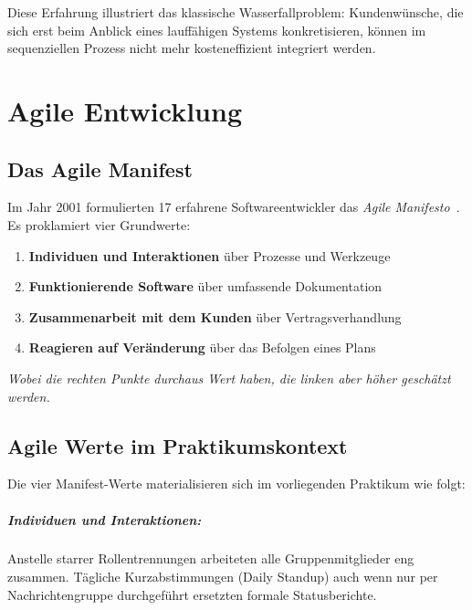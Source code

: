 \documentclass[12pt, a4paper, twoside]{report}
\begin{document}
Diese Erfahrung illustriert das klassische Wasserfallproblem: Kundenwünsche, die sich erst
beim Anblick eines lauffähigen Systems konkretisieren, können im sequenziellen Prozess nicht
mehr kosteneffizient integriert werden.

\chapter{Agile Entwicklung}
\label{chap:agil}

\section{Das Agile Manifest}

Im Jahr 2001 formulierten 17 erfahrene Softwareentwickler das \textit{Agile Manifesto}~\autocite{beck2001}.
Es proklamiert vier Grundwerte:

\begin{tcolorbox}[
  enhanced, breakable,
  colback=hsAccent!60, colframe=hsPrimary,
  title={\textbf{Die vier Werte des Agilen Manifests}},
  fonttitle=\bfseries, boxrule=1pt, arc=4pt
]
  \begin{enumerate}[label=\arabic*., leftmargin=1.5em]
    \item \textbf{Individuen und Interaktionen} über Prozesse und Werkzeuge
    \item \textbf{Funktionierende Software} über umfassende Dokumentation
    \item \textbf{Zusammenarbeit mit dem Kunden} über Vertragsverhandlung
    \item \textbf{Reagieren auf Veränderung} über das Befolgen eines Plans
  \end{enumerate}
  \vspace{6pt}
  \textit{Wobei die rechten Punkte durchaus Wert haben, die linken aber höher geschätzt werden.}
\end{tcolorbox}

\section{Agile Werte im Praktikumskontext}
\label{chap:agilewerte}

Die vier Manifest-Werte materialisieren sich im vorliegenden Praktikum wie folgt:

\paragraph{Individuen und Interaktionen:}
Anstelle starrer Rollentrennungen arbeiteten alle Gruppenmitglieder eng zusammen. Tägliche
Kurzabstimmungen (Daily Standup) \textendash{} auch wenn nur per Nachrichtengruppe durchgeführt
\textendash{} ersetzten formale Statusberichte.
\end{document}
